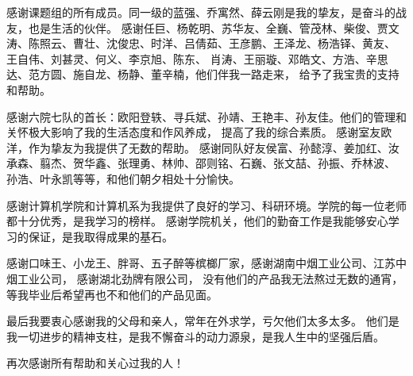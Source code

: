\begin{ack}
感谢课题组的所有成员。同一级的蓝强、乔寓然、薛云刚是我的挚友，是奋斗的战友，也是生活的伙伴。
感谢任巨、杨乾明、苏华友、全巍、管茂林、柴俊、贾文涛、陈照云、曹壮、沈俊忠、时洋、吕倩茹、王彦鹏、王泽龙、杨浩铎、黄友、
王自伟、刘甚灵、何义、李京旭、陈东、
肖涛、王丽璇、邓皓文、方浩、辛思达、范方圆、施自龙、杨静、董辛楠，他们伴我一路走来，
给予了我宝贵的支持和帮助。

感谢六院七队的首长：欧阳登轶、寻兵斌、孙靖、王艳丰、孙友佳。他们的管理和关怀极大影响了我的生活态度和作风养成，
提高了我的综合素质。
感谢室友欧洋，作为挚友为我提供了无数的帮助。
感谢同队好友侯富、孙懿淳、姜加红、汝承森、翦杰、贺华鑫、张理勇、林帅、邵则铭、石巍、张文喆、孙振、乔林波、
孙浩、叶永凯等等，和他们朝夕相处十分愉快。

感谢计算机学院和计算机系为我提供了良好的学习、科研环境。学院的每一位老师都十分优秀，是我学习的榜样。
感谢学院机关，他们的勤奋工作是我能够安心学习的保证，是我取得成果的基石。

感谢口味王、小龙王、胖哥、五子醉等槟榔厂家，感谢湖南中烟工业公司、江苏中烟工业公司，
感谢湖北劲牌有限公司，
没有他们的产品我无法熬过无数的通宵，
等我毕业后希望再也不和他们的产品见面。

最后我要衷心感谢我的父母和亲人，常年在外求学，亏欠他们太多太多。
他们是我一切进步的精神支柱，是我不懈奋斗的动力源泉，是我人生中的坚强后盾。

再次感谢所有帮助和关心过我的人！




\end{ack}
